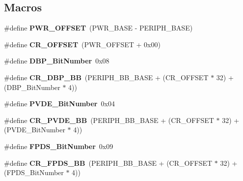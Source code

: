 \subsection*{Macros}
\begin{DoxyCompactItemize}
\item 
\hypertarget{group___p_w_r_ga7f88bce73931300319824f22578f90de}{\#define {\bfseries P\-W\-R\-\_\-\-O\-F\-F\-S\-E\-T}~(P\-W\-R\-\_\-\-B\-A\-S\-E -\/ P\-E\-R\-I\-P\-H\-\_\-\-B\-A\-S\-E)}\label{group___p_w_r_ga7f88bce73931300319824f22578f90de}

\item 
\hypertarget{group___p_w_r_gafa1d3d0ea72132df651c76fc1bdffffc}{\#define {\bfseries C\-R\-\_\-\-O\-F\-F\-S\-E\-T}~(P\-W\-R\-\_\-\-O\-F\-F\-S\-E\-T + 0x00)}\label{group___p_w_r_gafa1d3d0ea72132df651c76fc1bdffffc}

\item 
\hypertarget{group___p_w_r_ga36ff45d972bf94f31f172fd53cf44d23}{\#define {\bfseries D\-B\-P\-\_\-\-Bit\-Number}~0x08}\label{group___p_w_r_ga36ff45d972bf94f31f172fd53cf44d23}

\item 
\hypertarget{group___p_w_r_ga799ab60bdbcfc1076cf2d7f206d09b0c}{\#define {\bfseries C\-R\-\_\-\-D\-B\-P\-\_\-\-B\-B}~(P\-E\-R\-I\-P\-H\-\_\-\-B\-B\-\_\-\-B\-A\-S\-E + (C\-R\-\_\-\-O\-F\-F\-S\-E\-T $\ast$ 32) + (D\-B\-P\-\_\-\-Bit\-Number $\ast$ 4))}\label{group___p_w_r_ga799ab60bdbcfc1076cf2d7f206d09b0c}

\item 
\hypertarget{group___p_w_r_ga17d618eb800c401ef9c6789c9374eaf8}{\#define {\bfseries P\-V\-D\-E\-\_\-\-Bit\-Number}~0x04}\label{group___p_w_r_ga17d618eb800c401ef9c6789c9374eaf8}

\item 
\hypertarget{group___p_w_r_ga49f51ef8285a6be76fd204d49a00709c}{\#define {\bfseries C\-R\-\_\-\-P\-V\-D\-E\-\_\-\-B\-B}~(P\-E\-R\-I\-P\-H\-\_\-\-B\-B\-\_\-\-B\-A\-S\-E + (C\-R\-\_\-\-O\-F\-F\-S\-E\-T $\ast$ 32) + (P\-V\-D\-E\-\_\-\-Bit\-Number $\ast$ 4))}\label{group___p_w_r_ga49f51ef8285a6be76fd204d49a00709c}

\item 
\hypertarget{group___p_w_r_gad99a3da921e3e64587f6b9505ecba665}{\#define {\bfseries F\-P\-D\-S\-\_\-\-Bit\-Number}~0x09}\label{group___p_w_r_gad99a3da921e3e64587f6b9505ecba665}

\item 
\hypertarget{group___p_w_r_ga57d7041b5d1bf0ec94fa18152a7fa208}{\#define {\bfseries C\-R\-\_\-\-F\-P\-D\-S\-\_\-\-B\-B}~(P\-E\-R\-I\-P\-H\-\_\-\-B\-B\-\_\-\-B\-A\-S\-E + (C\-R\-\_\-\-O\-F\-F\-S\-E\-T $\ast$ 32) + (F\-P\-D\-S\-\_\-\-Bit\-Number $\ast$ 4))}\label{group___p_w_r_ga57d7041b5d1bf0ec94fa18152a7fa208}


\end{DoxyCompactItemize}
